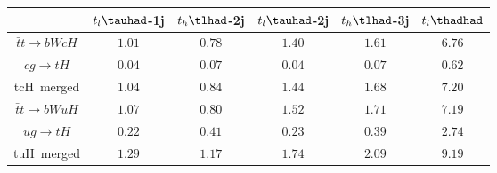 \centering
\begin{tabular}{|c|c|c|c|c|c|} \hline
 & $t_{l}\tauhad$-1j & $t_{h}\tlhad$-2j & $t_{l}\tauhad$-2j & $t_{h}\tlhad$-3j & $t_{l}\thadhad$\\\hline
$\bar{t}t\to bWcH$ & $1.01$ & $0.78$ & $1.40$ & $1.61$ & $6.76$\\\hline
$cg\to tH$ & $0.04$ & $0.07$ & $0.04$ & $0.07$ & $0.62$\\\hline
tcH~merged & $1.04$ & $0.84$ & $1.44$ & $1.68$ & $7.20$\\\hline
$\bar{t}t\to bWuH$ & $1.07$ & $0.80$ & $1.52$ & $1.71$ & $7.19$\\\hline
$ug\to tH$ & $0.22$ & $0.41$ & $0.23$ & $0.39$ & $2.74$\\\hline
tuH~merged & $1.29$ & $1.17$ & $1.74$ & $2.09$ & $9.19$\\\hline
\end{tabular}

